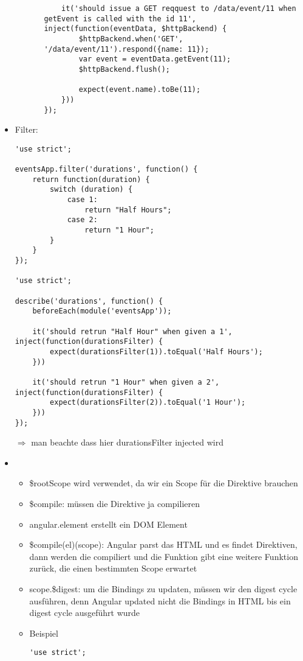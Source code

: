 \begin{itemize}
\begin{itemize}
\begin{itemize}
\begin{verbatim}
    it('should issue a GET reqquest to /data/event/11 when getEvent is called with the id 11', inject(function(eventData, $httpBackend) {
        $httpBackend.when('GET', '/data/event/11').respond({name: 11});
        var event = eventData.getEvent(11);
        $httpBackend.flush();

        expect(event.name).toBe(11);
    }))
});
            \end{verbatim}
        \end{itemize}
    \end{itemize}
  \item Filter:
    \begin{verbatim}
'use strict';

eventsApp.filter('durations', function() {
    return function(duration) {
        switch (duration) {
            case 1:
                return "Half Hours";
            case 2:
                return "1 Hour";
        }
    }
});

'use strict';

describe('durations', function() {
    beforeEach(module('eventsApp'));

    it('should retrun "Half Hour" when given a 1', inject(function(durationsFilter) {
        expect(durationsFilter(1)).toEqual('Half Hours');
    }))

    it('should retrun "1 Hour" when given a 2', inject(function(durationsFilter) {
        expect(durationsFilter(2)).toEqual('1 Hour');
    }))
});
    \end{verbatim}
	$\Rightarrow$  man beachte dass hier durationsFilter injected wird
  \item {}
    \begin{itemize}
      \item \$rootScope wird  verwendet, da wir ein Scope für die Direktive brauchen
      \item \$compile: müssen die Direktive ja compilieren
      \item angular.element erstellt ein DOM Element
      \item \$compile(el)(scope): Angular parst das HTML und es findet Direktiven, dann werden die
        compiliert und die Funktion gibt eine weitere Funktion zurück, die einen bestimmten Scope
        erwartet
      \item scope.\$digest: um die Bindings zu updaten, müssen wir den digest cycle ausführen, denn Angular
        updated nicht die Bindings in HTML bis ein digest cycle ausgeführt wurde
      \item Beispiel
        \begin{verbatim}
'use strict';


\end{verbatim}
\end{itemize}
\end{itemize}
